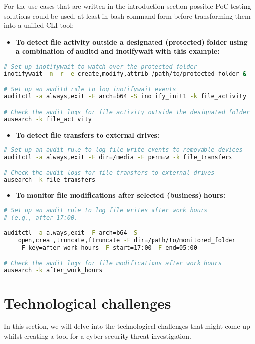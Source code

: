 \documentclass{VUMIFPSmagistrinis}
\begin{document}
For the use cases that are written in the introduction section possible PoC testing solutions could be used, at least in bash command form before transforming them into a unified CLI tool:
\begin{itemize}
    \item \textbf{To detect file activity outside a designated (protected) folder using a combination of auditd and inotifywait with this example:}
\end{itemize}
\begin{lstlisting}[language=bash]
# Set up inotifywait to watch over the protected folder
inotifywait -m -r -e create,modify,attrib /path/to/protected_folder &

# Set up an auditd rule to log inotifywait events
auditctl -a always,exit -F arch=b64 -S inotify_init1 -k file_activity

# Check the audit logs for file activity outside the designated folder
ausearch -k file_activity
\end{lstlisting}

\begin{itemize}
    \item \textbf{To detect file transfers to external drives:}
\end{itemize}
\begin{lstlisting}[language=bash]
# Set up an audit rule to log file write events to removable devices
auditctl -a always,exit -F dir=/media -F perm=w -k file_transfers

# Check the audit logs for file transfers to external drives
ausearch -k file_transfers
\end{lstlisting}

\begin{itemize}
    \item \textbf{To monitor file modifications after selected (business) hours:}
\end{itemize}
\begin{lstlisting}[language=bash]
# Set up an audit rule to log file writes after work hours 
# (e.g., after 17:00)

auditctl -a always,exit -F arch=b64 -S 
    open,creat,truncate,ftruncate -F dir=/path/to/monitored_folder 
    -F key=after_work_hours -F start=17:00 -F end=05:00

# Check the audit logs for file modifications after work hours
ausearch -k after_work_hours
\end{lstlisting}

\section{Technological challenges}
In this section, we will delve into the technological challenges that might come up whilst creating a tool for a cyber security threat investigation.
\end{document}
